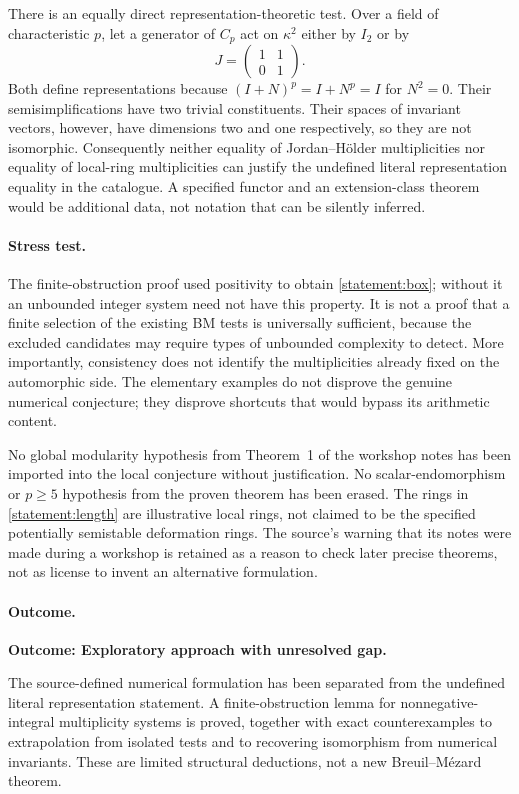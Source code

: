 \documentclass[11pt,a4paper]{article}
\numberwithin{equation}{section}
\begin{document}
There is an equally direct representation-theoretic test. Over a field
of characteristic $p$, let a generator of $C_p$ act on $\kappa^2$
either by $I_2$ or by
\[
 J=\begin{pmatrix}1&1\\0&1\end{pmatrix}.
\]
Both define representations because $(I+N)^p=I+N^p=I$ for $N^2=0$.
Their semisimplifications have two trivial constituents. Their spaces
of invariant vectors, however, have dimensions two and one respectively,
so they are not isomorphic. Consequently neither equality of
Jordan--H\"older multiplicities nor equality of local-ring multiplicities
can justify the undefined literal representation equality in the
catalogue. A specified functor and an extension-class theorem would be
additional data, not notation that can be silently inferred.

\paragraph{Stress test.}
The finite-obstruction proof used positivity to obtain
\eqref{statement:box}; without it an unbounded integer system need not have
this property. It is not a proof that a finite selection of the existing
BM tests is universally sufficient, because the excluded candidates may
require types of unbounded complexity to detect. More importantly,
consistency does not identify the multiplicities already fixed on the
automorphic side. The elementary examples do not disprove the genuine
numerical conjecture; they disprove shortcuts that would bypass its
arithmetic content.

No global modularity hypothesis from Theorem~1 of the workshop notes
has been imported into the local conjecture without justification.
No scalar-endomorphism or $p\ge5$ hypothesis from the proven theorem
has been erased. The rings in \eqref{statement:length} are illustrative local
rings, not claimed to be the specified potentially semistable
deformation rings. The source's warning that its notes were made during
a workshop is retained as a reason to check later precise theorems,
not as license to invent an alternative formulation.

\paragraph{Outcome.}
\textbf{Outcome: Exploratory approach with unresolved gap.}

The source-defined numerical formulation has been separated from the
undefined literal representation statement. A finite-obstruction lemma
for nonnegative-integral multiplicity systems is proved, together with
exact counterexamples to extrapolation from isolated tests and to
recovering isomorphism from numerical invariants. These are limited
structural deductions, not a new Breuil--M\'ezard theorem.
\end{document}

